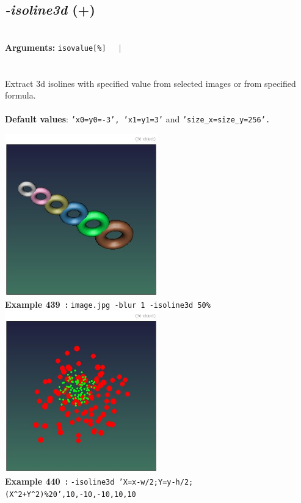 \documentclass[a4paper,11pt,twoside]{book}
\begin{document}
\subsection{\emph{-isoline3d} (+)}\vspace*{-0.5em}
~\\\textbf{Arguments: } 
{\small \texttt{isovalue[\%]}}~~~$|$\\
\\~\\
Extract 3d isolines with specified value from selected images or from specified formula.
~\\~\\\textbf{Default values}: {\small \texttt{'x0=y0=-3', 'x1=y1=3'} and \texttt{'size\_x=size\_y=256'.}}
\begin{center}\includegraphics[keepaspectratio=true,height=7cm,width=\textwidth]{img/gmic_def439.jpg}\\
{\footnotesize \textbf{Example 439~:} \texttt{image.jpg -blur 1 -isoline3d 50\%}}
\\\includegraphics[keepaspectratio=true,height=7cm,width=\textwidth]{img/gmic_def440.jpg}\\
{\footnotesize \textbf{Example 440~:} \texttt{-isoline3d 'X=x-w/2;Y=y-h/2;(X\textasciicircum 2+Y\textasciicircum 2)\%20',10,-10,-10,10,10}}
\end{center}
\end{document}
